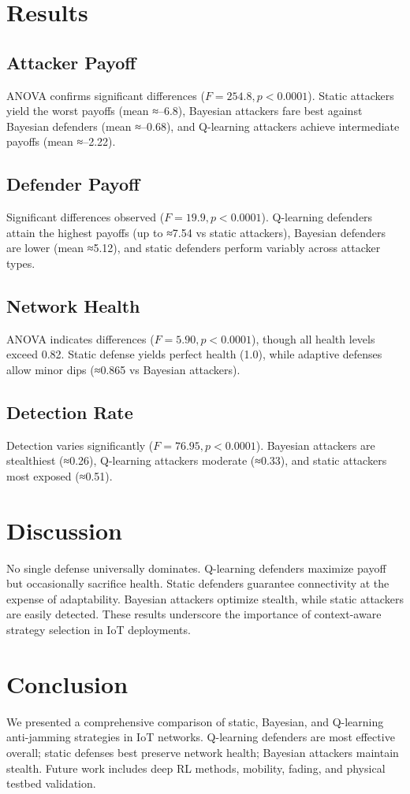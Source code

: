 \documentclass[conference]{IEEEtran}
\begin{document}
\section{Results}
\subsection{Attacker Payoff}
ANOVA confirms significant differences (\(F=254.8, p<0.0001\)). Static attackers yield the worst payoffs (mean ≈–6.8), Bayesian attackers fare best against Bayesian defenders (mean ≈–0.68), and Q-learning attackers achieve intermediate payoffs (mean ≈–2.22).

\subsection{Defender Payoff}
Significant differences observed (\(F=19.9, p<0.0001\)). Q-learning defenders attain the highest payoffs (up to ≈7.54 vs static attackers), Bayesian defenders are lower (mean ≈5.12), and static defenders perform variably across attacker types.

\subsection{Network Health}
ANOVA indicates differences (\(F=5.90, p<0.0001\)), though all health levels exceed 0.82. Static defense yields perfect health (1.0), while adaptive defenses allow minor dips (≈0.865 vs Bayesian attackers).

\subsection{Detection Rate}
Detection varies significantly (\(F=76.95, p<0.0001\)). Bayesian attackers are stealthiest (≈0.26), Q-learning attackers moderate (≈0.33), and static attackers most exposed (≈0.51).

\section{Discussion}
No single defense universally dominates. Q-learning defenders maximize payoff but occasionally sacrifice health. Static defenders guarantee connectivity at the expense of adaptability. Bayesian attackers optimize stealth, while static attackers are easily detected. These results underscore the importance of context-aware strategy selection in IoT deployments.

\section{Conclusion}
We presented a comprehensive comparison of static, Bayesian, and Q-learning anti-jamming strategies in IoT networks. Q-learning defenders are most effective overall; static defenses best preserve network health; Bayesian attackers maintain stealth. Future work includes deep RL methods, mobility, fading, and physical testbed validation.



\end{document}
